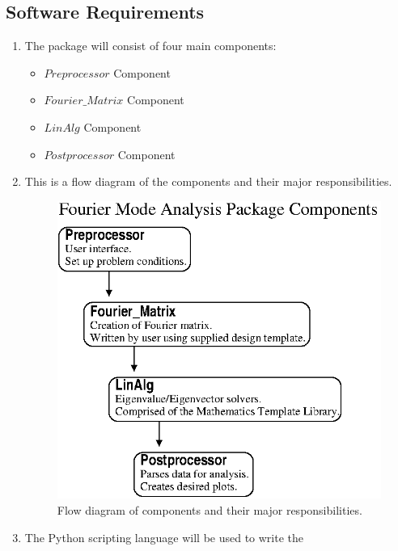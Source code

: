 \documentclass[11pt]{nmemo}
\begin{document}
\subsection{Software Requirements}
\begin{enumerate}
 \item The package will consist of four main components:
 \begin{itemize}
  \item ${Preprocessor}$ Component
  \item ${Fourier\_Matrix}$ Component
  \item ${LinAlg}$ Component
  \item ${Postprocessor}$ Component
 \end{itemize}
 \item This is a flow diagram of the components and their major
   responsibilities.
 \begin{figure}[htbp]
  \begin{centering}
   \begin{center}
    \includegraphics[scale=1.0]{components.eps}
   \end{center}
   \caption{Flow diagram of components and their major responsibilities.}
   \label{Components}
  \end{centering}
 \end{figure}
 \item The Python scripting language will be used to write the

\end{enumerate}
\end{document}
